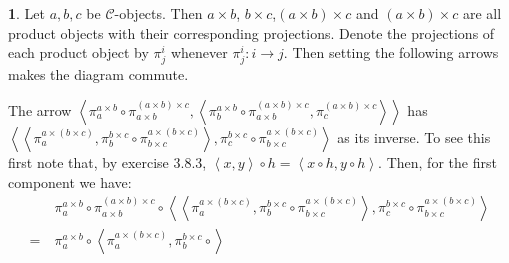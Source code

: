 \documentclass{article}
\theoremstyle{definition}
\newcommand{\CC}{\mathscr{C}}
\newcommand{\ang}[1]{\left\langle #1 \right\rangle}
\theoremstyle{definition}
\newtheorem{solution-internal}{}[subsection]
\newenvironment{solution}{
  \begin{solution-internal}
}{
  \end{solution-internal}
}
\begin{document}
\newpage
\begin{solution}
  Let $a, b, c$ be $\CC$-objects. Then $a \times b$, $b \times c$,$(a\times b)
  \times c$ and $(a\times b)\times c$ are all product objects with their
  corresponding projections. Denote the projections of each
  product object by $\pi^i_j$ whenever $\pi^i_j\colon i \to j$.
  Then setting the following arrows makes the diagram commute.

  \begin{center}
  \end{center}
The arrow $\ang{\pi^{a\times b}_a \circ \pi^{(a\times b) \times c}_{a\times
b}, \ang{\pi^{a\times b}_b \circ \pi^{(a\times b)\times c}_{a\times b},
\pi^{(a\times b)\times c}_c}}$ has 
$\ang{\ang{\pi^{a\times(b\times c)}_a, \pi^{b\times c}_b \circ
\pi^{a\times(b\times c)}_{b\times c}}, \pi^{b\times c}_c \circ \pi^{a\times
(b\times c)}_{b\times c}}$ as its inverse.
To see this first note that, by exercise 3.8.3, $\ang{x,y} \circ h =
\ang{x \circ h, y \circ h}$. Then, for the first component we have: 
  \begin{align*}
    & \pi^{a\times b}_a \circ \pi^{(a\times b) \times c}_{a\times
b} \circ \ang{\ang{\pi^{a\times(b\times c)}_a, \pi^{b\times c}_b \circ
\pi^{a\times(b\times c)}_{b\times c}}, \pi^{b\times c}_c \circ \pi^{a\times
(b\times c)}_{b\times c}} \\
    =~& \pi^{a\times b}_a \circ \ang{\pi^{a\times(b\times c)}_a, \pi^{b\times c}_b \circ
}
\end{align*}
\end{solution}
\end{document}
